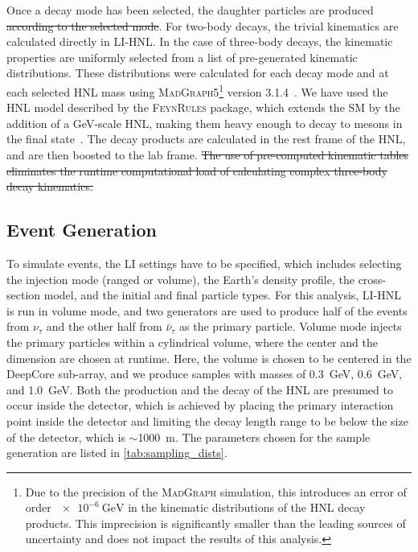 \documentclass[
    aps,
    prd,
    reprint,
    amsmath,
    amssymb,
    nofootinbib,
    superscriptaddress,
    floatfix
]{revtex4-2}
\newcommand{\gev}{\giga\electronvolt}
\providecommand{\DIFaddtex}[1]{{\protect\color{blue}\uwave{#1}}} %
\providecommand{\DIFdeltex}[1]{{\protect\color{red}\sout{#1}}}                      %
\providecommand{\DIFaddbegin}{} %
\providecommand{\DIFaddend}{} %
\providecommand{\DIFdelbegin}{} %
\providecommand{\DIFdelend}{} %
\providecommand{\DIFadd}[1]{\texorpdfstring{\DIFaddtex{#1}}{#1}} %
\providecommand{\DIFdel}[1]{\texorpdfstring{\DIFdeltex{#1}}{}} %
\newcommand{\DIFscaledelfig}{0.5}
\newlength{\DIFdelgraphicswidth} %
\newlength{\DIFdelgraphicsheight} %
\newcommand{\DIFaddincludegraphics}[2][]{{\color{blue}\fbox{\DIFOincludegraphics[#1]{#2}}}} %
\newcommand{\DIFdelincludegraphics}[2][]{%
\sbox{\DIFdelgraphicsbox}{\DIFOincludegraphics[#1]{#2}}%
\settoboxwidth{\DIFdelgraphicswidth}{\DIFdelgraphicsbox} %
\settoboxtotalheight{\DIFdelgraphicsheight}{\DIFdelgraphicsbox} %
\scalebox{\DIFscaledelfig}{%
\parbox[b]{\DIFdelgraphicswidth}{\usebox{\DIFdelgraphicsbox}\\[-\baselineskip] \rule{\DIFdelgraphicswidth}{0em}}\llap{\resizebox{\DIFdelgraphicswidth}{\DIFdelgraphicsheight}{%
\setlength{\unitlength}{\DIFdelgraphicswidth}%
\begin{picture}(1,1)%
\thicklines\linethickness{2pt} %
{\color[rgb]{1,0,0}\put(0,0){\framebox(1,1){}}}%
{\color[rgb]{1,0,0}\put(0,0){\line( 1,1){1}}}%
{\color[rgb]{1,0,0}\put(0,1){\line(1,-1){1}}}%
\end{picture}%
}\hspace*{3pt}}} %
} %
\DeclareRobustCommand{\DIFaddbegin}{\DIFOaddbegin \let\includegraphics\DIFaddincludegraphics} %
\DeclareRobustCommand{\DIFaddend}{\DIFOaddend \let\includegraphics\DIFOincludegraphics} %
\DeclareRobustCommand{\DIFdelbegin}{\DIFOdelbegin \let\includegraphics\DIFdelincludegraphics} %
\DeclareRobustCommand{\DIFdelend}{\DIFOaddend \let\includegraphics\DIFOincludegraphics} %
\begin{document}
Once a decay mode has been selected, the daughter particles are produced \DIFdelbegin \DIFdel{according to the selected mode}\DIFdelend \DIFaddbegin \DIFadd{accordingly}\DIFaddend . For two-body decays, the trivial kinematics are calculated directly in LI-HNL. In the case of three-body decays, the kinematic properties are uniformly selected from a list of pre-generated kinematic distributions. These distributions were calculated for each decay mode and at each selected HNL mass using \textsc{MadGraph5}\footnote{Due to the precision of the \textsc{MadGraph} simulation, this introduces an error of order $\SI{e-6}{\gev}$ in the kinematic distributions of the HNL decay products. This imprecision is significantly smaller than the leading sources of uncertainty and does not impact the results of this analysis.} version 3.1.4~\cite{Alwall:2014hca}.
We have used the HNL model described by the \textsc{FeynRules} package, which extends the SM by the addition of a GeV-scale HNL, making them heavy enough to decay to mesons in the final state~\cite{Coloma:2017ppo}.
The decay products are calculated in the rest frame of the HNL, and are then boosted to the lab frame.
\DIFdelbegin \DIFdel{The use of pre-computed kinematic tables eliminates the runtime computational load of calculating complex three-body decay kinematics.
}\DIFdelend %


\subsection{Event Generation}

To simulate events, the LI settings have to be specified, which includes selecting the injection mode (ranged or volume), the Earth's density profile, the cross-section model, and the initial and final particle types.
For this analysis, LI-HNL is run in volume mode, and two generators are used to produce half of the events from $\nu_\tau$ and the other half from $\bar{\nu}_\tau$ as the primary particle. Volume mode injects the primary particles within a cylindrical volume, where the center and the dimension are chosen at runtime. Here, the volume is chosen to be centered in the DeepCore sub-array, and we produce samples with masses of \SI{0.3}{\gev}, \SI{0.6}{\gev}, and \SI{1.0}{\gev}.
Both the production and the decay of the HNL are presumed to occur inside the detector, which is achieved by placing the primary interaction point inside the detector and limiting the decay length range to be below the size of the detector, which is $\sim$\SI{1000}{\meter}. The parameters chosen for the sample generation are listed in \cref{tab:sampling_dists}. 
\end{document}
